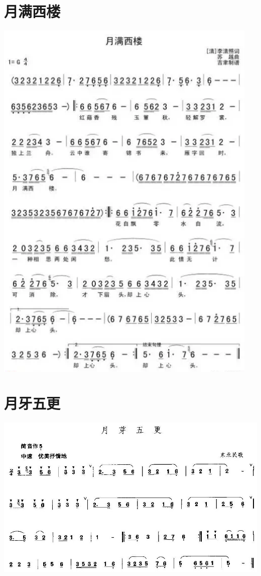 \documentclass[cn,pad,twocol]{elegantbook}
\begin{document}
\section{月满西楼}\includegraphics[width=0.95\textwidth]{dongxiao/20200819/月满西楼.png}
\section{月牙五更}\includegraphics[width=\textwidth]{dongxiao/20200819/月牙五更.jpeg}
\end{document}
